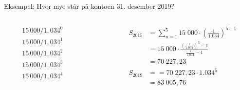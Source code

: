 \begin{frame}[t]{Eksempel: Hvor mye står på kontoen 31. desember 2019?}
\begin{center}
\end{center}
\begin{columns}[T,onlytextwidth]
  \begin{column}{0.10\textwidth}
    \begin{align*}
      &15\,000 / 1,034^0\\
      &15\,000 / 1,034^1\\
      &15\,000 / 1,034^2\\
      &15\,000 / 1,034^3\\
      &15\,000 / 1,034^4
    \end{align*}
  \end{column}
  \begin{column}{0.30\textwidth}
  \end{column}
   \begin{column}{0.60\textwidth}
   \begin{align*}
     S_{2015}&=\sum_{n=1}^5 15\;000\cdot \left(\frac{1}{1.034}\right)^{5-1}\\
             &=15\;000\cdot \frac{\left(\frac{1}{1.034}\right)^5-1}{\frac{1}{1.034}-1}\\
             &=70\;227,23\\
     S_{2019}&==70\;227,23\cdot 1.034^5\\
             &=83\;005,76
   \end{align*}
\end{column}
\end{columns}
\end{frame}

